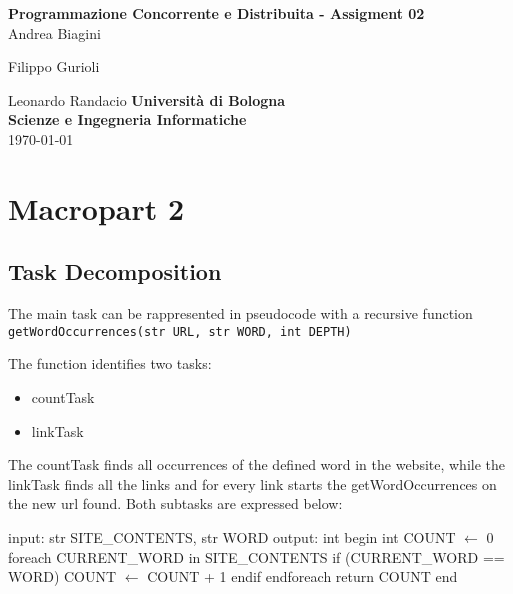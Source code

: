 \documentclass[12pt, a4paper]{report}
\begin{document}
\renewcommand\bibname{References} %


\begin{titlepage}

\begin{center}

\Large \textbf {Programmazione Concorrente e Distribuita - Assigment 02}\\%
\vspace{1em}%
\vfill
Andrea Biagini


Filippo Gurioli


Leonardo Randacio
\vspace{1em}
\vfill
{\bf Università di Bologna \\ Scienze e Ingegneria Informatiche}\\[0.5in]

       
\vfill
\today

\end{center}

\end{titlepage}


\tableofcontents

\newpage
{} %

\chapter{Macropart 2}
\section{Task Decomposition}
The main task can be rappresented in pseudocode with a recursive function \texttt{getWordOccurrences(str URL, str WORD, int DEPTH)}

The function identifies two tasks:
\begin{itemize}
    \item countTask
    \item linkTask
\end{itemize}
The countTask finds all occurrences of the defined word in the website, while the linkTask finds all the links and for every link starts the
 getWordOccurrences on the new url found. Both subtasks are expressed below:

\newpage

\begin{algorithm}[caption={countTask expressed in pseudocode}, label={alg1}]
input: str SITE_CONTENTS, str WORD
output: int
begin
    int COUNT $\gets$ 0
    foreach CURRENT_WORD in SITE_CONTENTS
        if (CURRENT_WORD == WORD)
            COUNT $\gets$ COUNT + 1
        endif
    endforeach
    return COUNT
end       
\end{algorithm}
\end{document}
